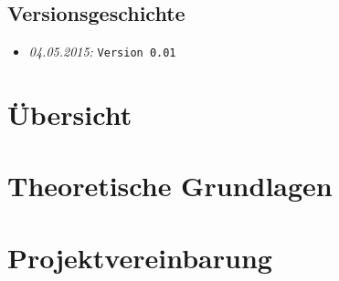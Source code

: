 \documentclass{fhnwreport/fhnwreport}
\begin{document}


\tableofcontents
\vspace{80mm}
\subsection*{Versionsgeschichte}
\begin{itemize}
    \item[]
        \emph{04.05.2015:} \texttt{Version 0.01}
\end{itemize}
\clearpage

\section{\"Ubersicht}
\label{sec:ubersicht}


\clearpage
\section{Theoretische Grundlagen}
\label{sec:theor_basics}



%


\clearpage
{}
{}
{}

\clearpage
\section*{Projektvereinbarung}
\label{sec:projektvereinbarung}

\end{document}
